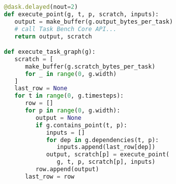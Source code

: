 \begin{lstlisting}[language=Python,caption={Excerpt from Task Bench implementation in Dask.\label{lst:code-sample}},float]
@dask.delayed(nout=2)
def execute_point(g, t, p, scratch, inputs):
   output = make_buffer(g.output_bytes_per_task)
   # call Task Bench Core API...
   return output, scratch

def execute_task_graph(g):
   scratch = [
      make_buffer(g.scratch_bytes_per_task)
      for _ in range(0, g.width)
   ]
   last_row = None
   for t in range(0, g.timesteps):
      row = []
      for p in range(0, g.width):
         output = None
         if g.contains_point(t, p):
            inputs = []
            for dep in g.dependencies(t, p):
               inputs.append(last_row[dep])
            output, scratch[p] = execute_point(
               g, t, p, scratch[p], inputs)
         row.append(output)
      last_row = row
\end{lstlisting}

